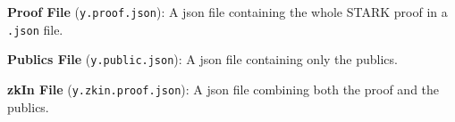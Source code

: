 \vspace{0.1cm}
\begin{compactitem}
\item \textbf{Proof File} (\texttt{y.proof.json}): A json file containing the whole STARK proof in a \texttt{.json} file. 

\item \textbf{Publics File} (\texttt{y.public.json}): A json file containing only the publics. 

\item \textbf{zkIn File} (\texttt{y.zkin.proof.json}): A json file combining both the proof and the publics. 
\end{compactitem}